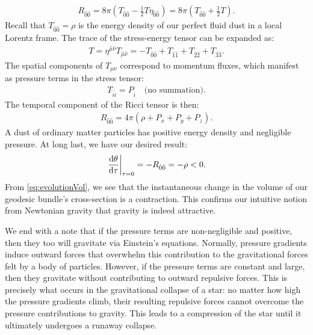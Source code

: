 \documentclass[10pt]{article}
\newcommand{\<}{\langle}
\renewcommand{\>}{\rangle}
\renewcommand{\(}{\left(}
\renewcommand{\)}{\right)}
\renewcommand{\[}{\left[}
\renewcommand{\]}{\right]}
\begin{document}
		\begin{align}
			R_{\hat{0}\hat{0}} = 8\pi \( T_{\hat{0}\hat{0}} - \frac{1}{2}T \eta_{\hat{0}\hat{0}} \) = 8\pi \( T_{\hat{0}\hat{0}} + \frac{1}{2}T \).
		\end{align}
		Recall that $T_{\hat{0}\hat{0}}=\rho$ is the energy density of our perfect fluid dust in a local Lorentz frame. The trace of the stress-energy tensor can be expanded as:
		\begin{align}
			T = \eta^{\hat{\mu}\hat{\nu}} T_{\hat{\mu}\hat{\nu}} = -T_{\hat{0}\hat{0}} + T_{\hat{1}\hat{1}} + T_{\hat{2}\hat{2}} + T_{\hat{3}\hat{3}}.
		\end{align}
		The spatial components of $T_{\mu\nu}$ correspond to momentum fluxes, which manifest as pressure terms in the stress tensor:
		\begin{align}
			T_{\hat{i}\hat{i}} = P_{\hat{i}} \quad\text{(no summation)}.
		\end{align}
		The temporal component of the Ricci tensor is then:
		\begin{align}
			R_{\hat{0}\hat{0}} = 4\pi \( \rho + P_x + P_y + P_z \).
		\end{align}
		A dust of ordinary matter particles has positive energy density and negligible pressure. At long last, we have our desired result:
		\begin{align}
			\left.\dv{\theta}{\tau}\right|_{\tau=0} = -R_{\hat{0}\hat{0}} = -\rho < 0.
		\end{align}
		From \eqref{eq:evolutionVol}, we see that the instantaneous change in the volume of our geodesic bundle's cross-section is a contraction. This confirms our intuitive notion from Newtonian gravity that gravity is indeed attractive.
		
		We end with a note that if the pressure terms are non-negligible and positive, then they too will gravitate via Einstein's equations. Normally, pressure gradients induce outward forces that overwhelm this contribution to the gravitational forces felt by a body of particles. However, if the pressure terms are constant and large, then they gravitate without contributing to outward repulsive forces. This is precisely what occurs in the gravitational collapse of a star: no matter how high the pressure gradients climb, their resulting repulsive forces cannot overcome the pressure contributions to gravity. This leads to a compression of the star until it ultimately undergoes a runaway collapse.
		
\end{document}
